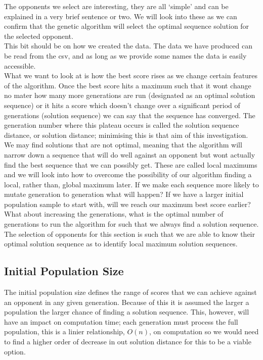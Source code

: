 The opponents we select are interesting, they are all `simple' and can be explained in a very brief sentence or two. We will look into these as we can confirm that the genetic algorithm will select the optimal sequence solution for the selected opponent. \\


This bit should be on how we created the data. The data we have produced can be read from the csv, and as long as we provide some names the data is easily accessible.\\

What we want to look at is how the best score rises as we change certain features of the algorithm. Once the best score hits a maximum such that it wont change no mater how many more generations are run (designated as an optimal solution sequence) or it hits a score which doesn't change over a significant period of generations (solution sequence) we can say that the sequence has converged. The generation number where this plateau occurs is called the solution sequence distance, or solution distance; minimising this is that aim of this investigation.
We may find solutions that are not optimal, meaning that the algorithm will narrow down a sequence that will do well against an opponent but wont actually find the best sequence that we can possibly get. These are called local maximums and we will look into how to overcome the possibility of our algorithm finding a local, rather than, global maximum later.
If we make each sequence more likely to mutate generation to generation what will happen? If we have a larger initial population sample to start with, will we reach our maximum best score earlier? What about increasing the generations, what is the optimal number of generations to run the algorithm for such that we always find a solution sequence.
The selection of opponents for this section is such that we are able to know their optimal solution sequence as to identify local maximum solution sequences.\\ 

\subsection{Initial Population Size}
    
The initial population size defines the range of scores that we can achieve against an opponent in any given generation. Because of this it is assumed the larger a population the larger chance of finding a solution sequence.
This, however, will have an impact on computation time; each generation must process the full population, this is a linier relationship, \(O(n)\), on computation so we would need to find a higher order of decrease in out solution distance for this to be a viable option.
    
